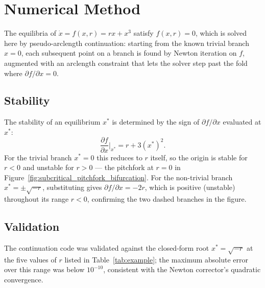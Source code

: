 \chapter{Numerical Method}
\label{ch:methods}

The equilibria of $\dot{x} = f(x, r) = rx + x^3$ satisfy $f(x, r) = 0$,
which is solved here by pseudo-arclength continuation: starting from the
known trivial branch $x = 0$, each subsequent point on a branch is found
by Newton iteration on $f$, augmented with an arclength constraint that
lets the solver step past the fold where $\partial f/\partial x = 0$.

\section{Stability}

The stability of an equilibrium $x^*$ is determined by the sign of
$\partial f/\partial x$ evaluated at $x^*$:
\begin{equation}
  \frac{\partial f}{\partial x}\bigg|_{x^*} = r + 3(x^*)^2.
\end{equation}
For the trivial branch $x^* = 0$ this reduces to $r$ itself, so the
origin is stable for $r < 0$ and unstable for $r > 0$ --- the pitchfork
at $r = 0$ in Figure~\ref{fig:subcritical_pitchfork_bifurcation}. For the
non-trivial branch $x^* = \pm\sqrt{-r}$, substituting gives
$\partial f/\partial x = -2r$, which is positive (unstable) throughout
its range $r < 0$, confirming the two dashed branches in the figure.

\section{Validation}

The continuation code was validated against the closed-form root
$x^* = \sqrt{-r}$ at the five values of $r$ listed in
Table~\ref{tab:example}; the maximum absolute error over this range was
below $10^{-10}$, consistent with the Newton corrector's quadratic
convergence.
